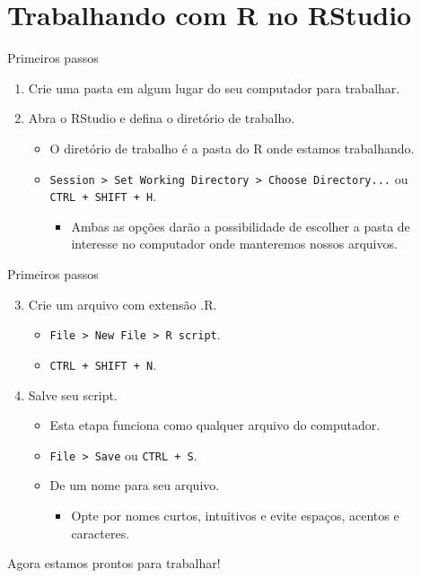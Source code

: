 \documentclass[
  ignorenonframetext,
  serif,
  professionalfont,
  usenames,
  dvipsnames,
  aspectratio = 169]{beamer}
\providecommand{\tightlist}{%
  \setlength{\itemsep}{0pt}\setlength{\parskip}{0pt}}
\renewcommand{\tightlist}{%
  \setlength{\itemsep}{0\baselineskip}
  \setlength{\parskip}{0.25\baselineskip}
}
\begin{document}
\section{Trabalhando com R no
RStudio}\label{trabalhando-com-r-no-rstudio}

\begin{frame}[fragile]{Primeiros passos}
\label{primeiros-passos}
\begin{enumerate}
\item
  Crie uma pasta em algum lugar do seu computador para trabalhar.
\item
  Abra o RStudio e defina o diretório de trabalho.

  \begin{itemize}
  \tightlist
  \item
    O diretório de trabalho é a pasta do R onde estamos trabalhando.
  \item
    \texttt{Session\ \textgreater{}\ Set\ Working\ Directory\ \textgreater{}\ Choose\ Directory...}
    ou \texttt{CTRL\ +\ SHIFT\ +\ H}.

    \begin{itemize}
    \tightlist
    \item
      Ambas as opções darão a possibilidade de escolher a pasta de
      interesse no computador onde manteremos nossos arquivos.
    \end{itemize}
  \end{itemize}
\end{enumerate}
\end{frame}

\begin{frame}[fragile]{Primeiros passos}
\label{primeiros-passos-1}
\begin{enumerate}
\setcounter{enumi}{2}
\tightlist
\item
  Crie um arquivo com extensão .R.

  \begin{itemize}
  \tightlist
  \item
    \texttt{File\ \textgreater{}\ New\ File\ \textgreater{}\ R\ script}.
  \item
    \texttt{CTRL\ +\ SHIFT\ +\ N}.
  \end{itemize}
\item
  Salve seu script.

  \begin{itemize}
  \tightlist
  \item
    Esta etapa funciona como qualquer arquivo do computador.
  \item
    \texttt{File\ \textgreater{}\ Save} ou \texttt{CTRL\ +\ S}.
  \item
    De um nome para seu arquivo.

    \begin{itemize}
    \tightlist
    \item
      Opte por nomes curtos, intuitivos e evite espaços, acentos e
      caracteres.
    \end{itemize}
  \end{itemize}
\end{enumerate}

Agora estamos prontos para trabalhar!
\end{frame}
\end{document}
